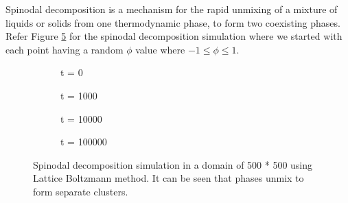 \documentclass{article}
\begin{document}
Spinodal decomposition is a mechanism for the rapid unmixing of a mixture of liquids or solids from one thermodynamic phase, to form two coexisting phases. Refer Figure \ref*{fig:spinod} for the spinodal decomposition simulation where we started with each point having a random $\phi$ value where $ -1 \leq \phi \leq 1.  $
\begin{figure}[h!]
	\centering
	\begin{subfigure}[h!]{4cm}            
		\caption{t = 0}
		\label{Fig:Data1}
	\end{subfigure}
	\begin{subfigure}[h!]{4cm}
		\centering
		\caption{t = 1000}
		\label{Fig:Data2}
	\end{subfigure}
	\begin{subfigure}[h!]{4cm}            
		\caption{t = 10000}
		\label{Fig:Data3}
	\end{subfigure}
	\begin{subfigure}[h!]{4cm}
		\centering
		\caption{t = 100000}
		\label{Fig:Data4}
	\end{subfigure}
	\caption{Spinodal decomposition simulation in a domain of 500 * 500 using Lattice Boltzmann method. It can be seen that phases unmix to form separate clusters.}\label{fig:spinod}
\end{figure}
\end{document}
